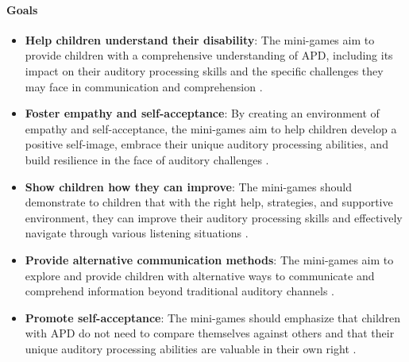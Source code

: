 \paragraph{Goals}
\begin{itemize}
    \item \textbf{Help children understand their disability}: The mini-games aim to provide children with a comprehensive understanding of APD, including its impact on their auditory processing skills and the specific challenges they may face in communication and comprehension \cite{Nationwide}.
    \item \textbf{Foster empathy and self-acceptance}: By creating an environment of empathy and self-acceptance, the mini-games aim to help children develop a positive self-image, embrace their unique auditory processing abilities, and build resilience in the face of auditory challenges \cite{KidsHealth}.
    \item \textbf{Show children how they can improve}: The mini-games should demonstrate to children that with the right help, strategies, and supportive environment, they can improve their auditory processing skills and effectively navigate through various listening situations \cite{WebMD}.
    \item \textbf{Provide alternative communication methods}: The mini-games aim to explore and provide children with alternative ways to communicate and comprehend information beyond traditional auditory channels \cite{Nationwide}.
    \item \textbf{Promote self-acceptance}: The mini-games should emphasize that children with APD do not need to compare themselves against others and that their unique auditory processing abilities are valuable in their own right \cite{Nationwide}.
\end{itemize}

